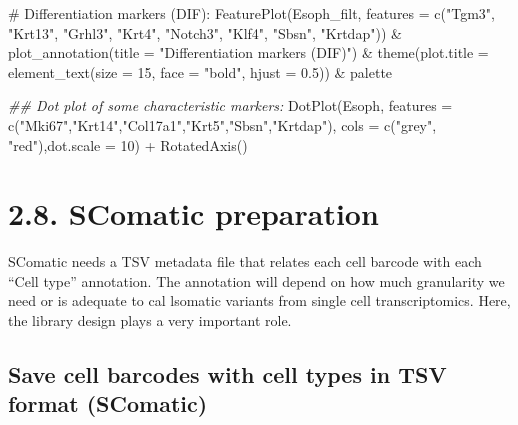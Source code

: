 \documentclass[
  letterpaper,
  DIV=11,
  numbers=noendperiod]{scrreprt}
\newenvironment{Shaded}{\begin{snugshade}}{\end{snugshade}}
\newcommand{\AttributeTok}[1]{\textcolor[rgb]{0.40,0.45,0.13}{#1}}
\newcommand{\CommentTok}[1]{\textcolor[rgb]{0.37,0.37,0.37}{#1}}
\newcommand{\DecValTok}[1]{\textcolor[rgb]{0.68,0.00,0.00}{#1}}
\newcommand{\DocumentationTok}[1]{\textcolor[rgb]{0.37,0.37,0.37}{\textit{#1}}}
\newcommand{\FloatTok}[1]{\textcolor[rgb]{0.68,0.00,0.00}{#1}}
\newcommand{\FunctionTok}[1]{\textcolor[rgb]{0.28,0.35,0.67}{#1}}
\newcommand{\NormalTok}[1]{\textcolor[rgb]{0.00,0.23,0.31}{#1}}
\newcommand{\SpecialCharTok}[1]{\textcolor[rgb]{0.37,0.37,0.37}{#1}}
\newcommand{\StringTok}[1]{\textcolor[rgb]{0.13,0.47,0.30}{#1}}
\begin{document}
\begin{Shaded}
\begin{Highlighting}[]
\CommentTok{\# Differentiation markers (DIF):}
\FunctionTok{FeaturePlot}\NormalTok{(Esoph\_filt, }\AttributeTok{features =} \FunctionTok{c}\NormalTok{(}\StringTok{"Tgm3"}\NormalTok{, }\StringTok{"Krt13"}\NormalTok{, }\StringTok{"Grhl3"}\NormalTok{, }\StringTok{"Krt4"}\NormalTok{, }\StringTok{"Notch3"}\NormalTok{, }\StringTok{"Klf4"}\NormalTok{, }\StringTok{"Sbsn"}\NormalTok{, }\StringTok{"Krtdap"}\NormalTok{)) }\SpecialCharTok{\&} \FunctionTok{plot\_annotation}\NormalTok{(}\AttributeTok{title =} \StringTok{"Differentiation markers (DIF)"}\NormalTok{) }\SpecialCharTok{\&} \FunctionTok{theme}\NormalTok{(}\AttributeTok{plot.title =} \FunctionTok{element\_text}\NormalTok{(}\AttributeTok{size =} \DecValTok{15}\NormalTok{, }\AttributeTok{face =} \StringTok{"bold"}\NormalTok{, }\AttributeTok{hjust =} \FloatTok{0.5}\NormalTok{)) }\SpecialCharTok{\&}\NormalTok{ palette}
\end{Highlighting}
\end{Shaded}

\begin{Shaded}
\begin{Highlighting}[]
\DocumentationTok{\#\# Dot plot of some characteristic markers:}
\FunctionTok{DotPlot}\NormalTok{(Esoph, }\AttributeTok{features =} \FunctionTok{c}\NormalTok{(}\StringTok{"Mki67"}\NormalTok{,}\StringTok{"Krt14"}\NormalTok{,}\StringTok{"Col17a1"}\NormalTok{,}\StringTok{"Krt5"}\NormalTok{,}\StringTok{"Sbsn"}\NormalTok{,}\StringTok{"Krtdap"}\NormalTok{), }\AttributeTok{cols =} \FunctionTok{c}\NormalTok{(}\StringTok{"grey"}\NormalTok{, }\StringTok{"red"}\NormalTok{),}\AttributeTok{dot.scale =} \DecValTok{10}\NormalTok{) }\SpecialCharTok{+} \FunctionTok{RotatedAxis}\NormalTok{()}
\end{Highlighting}
\end{Shaded}

\section{2.8. SComatic preparation}\label{scomatic-preparation}

SComatic needs a TSV metadata file that relates each cell barcode with
each ``Cell type'' annotation. The annotation will depend on how much
granularity we need or is adequate to cal lsomatic variants from single
cell transcriptomics. Here, the library design plays a very important
role.

\subsection{Save cell barcodes with cell types in TSV format
(SComatic)}\label{save-cell-barcodes-with-cell-types-in-tsv-format-scomatic}
\end{document}
